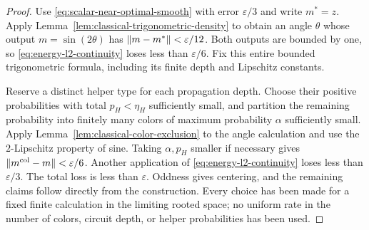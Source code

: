 \begin{proof}
Use \eqref{eq:scalar-near-optimal-smooth} with error
$\varepsilon/3$ and write $m^*=z$.  Apply Lemma~\ref{lem:classical-trigonometric-density}
to obtain an angle $\theta$ whose output $m=\sin(2\theta)$ has
$\lVert m-m^*\rVert<\varepsilon/12$.  Both outputs are bounded by one,
so \eqref{eq:energy-l2-continuity} loses less than
$\varepsilon/6$.  Fix this entire bounded trigonometric formula,
including its finite depth and Lipschitz constants.

Reserve a distinct helper type for each propagation depth.
Choose their positive probabilities with total
$p_H<\eta_H$ sufficiently small, and partition the remaining
probability into finitely many colors of maximum probability
$\alpha$ sufficiently small.  Apply
Lemma~\ref{lem:classical-color-exclusion} to the angle calculation
and use the $2$-Lipschitz property of sine.  Taking $\alpha,p_H$
smaller if necessary gives
$\lVert m^{\mathrm{col}}-m\rVert<\varepsilon/6$.
Another application of \eqref{eq:energy-l2-continuity} loses less
than $\varepsilon/3$.  The total loss is less than $\varepsilon$.
Oddness gives centering, and the remaining claims follow directly
from the construction. Every choice has been made for a fixed finite
calculation in the limiting rooted space; no uniform rate in
the number of colors, circuit depth, or helper probabilities has
been used.
\end{proof}
